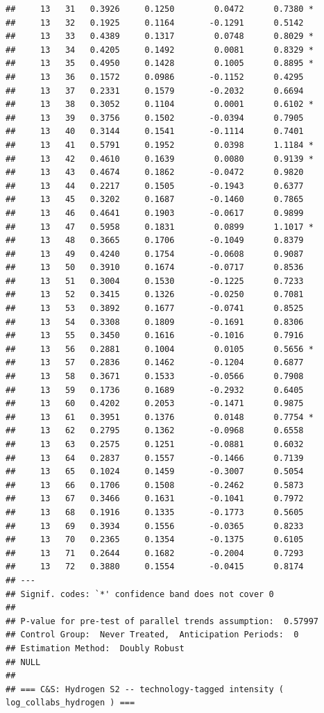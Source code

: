 \documentclass[
]{article}
\begin{document}
\begin{verbatim}
##     13   31   0.3926     0.1250        0.0472      0.7380 *
##     13   32   0.1925     0.1164       -0.1291      0.5142  
##     13   33   0.4389     0.1317        0.0748      0.8029 *
##     13   34   0.4205     0.1492        0.0081      0.8329 *
##     13   35   0.4950     0.1428        0.1005      0.8895 *
##     13   36   0.1572     0.0986       -0.1152      0.4295  
##     13   37   0.2331     0.1579       -0.2032      0.6694  
##     13   38   0.3052     0.1104        0.0001      0.6102 *
##     13   39   0.3756     0.1502       -0.0394      0.7905  
##     13   40   0.3144     0.1541       -0.1114      0.7401  
##     13   41   0.5791     0.1952        0.0398      1.1184 *
##     13   42   0.4610     0.1639        0.0080      0.9139 *
##     13   43   0.4674     0.1862       -0.0472      0.9820  
##     13   44   0.2217     0.1505       -0.1943      0.6377  
##     13   45   0.3202     0.1687       -0.1460      0.7865  
##     13   46   0.4641     0.1903       -0.0617      0.9899  
##     13   47   0.5958     0.1831        0.0899      1.1017 *
##     13   48   0.3665     0.1706       -0.1049      0.8379  
##     13   49   0.4240     0.1754       -0.0608      0.9087  
##     13   50   0.3910     0.1674       -0.0717      0.8536  
##     13   51   0.3004     0.1530       -0.1225      0.7233  
##     13   52   0.3415     0.1326       -0.0250      0.7081  
##     13   53   0.3892     0.1677       -0.0741      0.8525  
##     13   54   0.3308     0.1809       -0.1691      0.8306  
##     13   55   0.3450     0.1616       -0.1016      0.7916  
##     13   56   0.2881     0.1004        0.0105      0.5656 *
##     13   57   0.2836     0.1462       -0.1204      0.6877  
##     13   58   0.3671     0.1533       -0.0566      0.7908  
##     13   59   0.1736     0.1689       -0.2932      0.6405  
##     13   60   0.4202     0.2053       -0.1471      0.9875  
##     13   61   0.3951     0.1376        0.0148      0.7754 *
##     13   62   0.2795     0.1362       -0.0968      0.6558  
##     13   63   0.2575     0.1251       -0.0881      0.6032  
##     13   64   0.2837     0.1557       -0.1466      0.7139  
##     13   65   0.1024     0.1459       -0.3007      0.5054  
##     13   66   0.1706     0.1508       -0.2462      0.5873  
##     13   67   0.3466     0.1631       -0.1041      0.7972  
##     13   68   0.1916     0.1335       -0.1773      0.5605  
##     13   69   0.3934     0.1556       -0.0365      0.8233  
##     13   70   0.2365     0.1354       -0.1375      0.6105  
##     13   71   0.2644     0.1682       -0.2004      0.7293  
##     13   72   0.3880     0.1554       -0.0415      0.8174  
## ---
## Signif. codes: `*' confidence band does not cover 0
## 
## P-value for pre-test of parallel trends assumption:  0.57997
## Control Group:  Never Treated,  Anticipation Periods:  0
## Estimation Method:  Doubly Robust
## NULL
## 
## === C&S: Hydrogen S2 -- technology-tagged intensity ( log_collabs_hydrogen ) ===
\end{verbatim}
\end{document}
